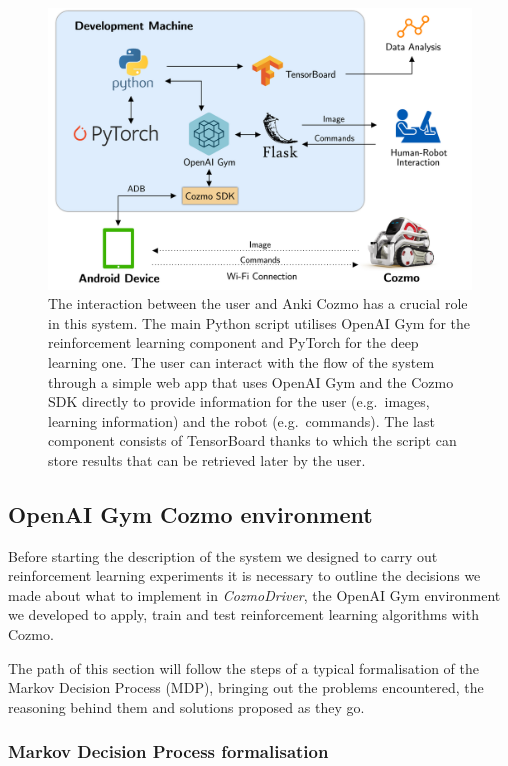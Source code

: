 \begin{figure}
    \centering
    \includegraphics[width=\textwidth]{img/cozmo-system.png}
    \caption[Outline of the control system]{The interaction between the user and Anki Cozmo has a crucial role in this system.
        The main Python script utilises OpenAI Gym for the reinforcement learning component and PyTorch for the deep learning one.
        The user can interact with the flow of the system through a simple web app that uses OpenAI Gym and the Cozmo SDK directly to provide information for the user (e.g.\ images, learning information) and the robot (e.g.\ commands).
        The last component consists of TensorBoard thanks to which the script can store results that can be retrieved later by the user.}
    \label{fig:system}
\end{figure}

\subsection{OpenAI Gym Cozmo environment}

Before starting the description of the system we designed to carry out reinforcement learning experiments it is necessary to outline the decisions we made about what to implement in \textit{CozmoDriver}, the OpenAI Gym environment we developed to apply, train and test reinforcement learning algorithms with Cozmo.

The path of this section will follow the steps of a typical formalisation of the Markov Decision Process (MDP), bringing out the problems encountered, the reasoning behind them and solutions proposed as they go.

\subsubsection{Markov Decision Process formalisation} \label{subsubsec:mdp_form}

